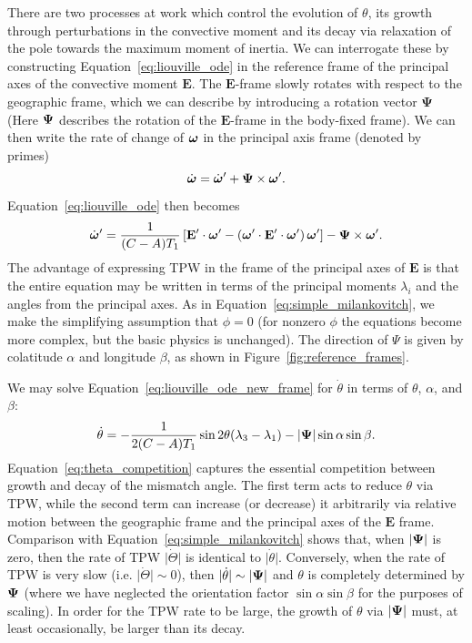 \documentclass[extra,mreferee]{gji}
\begin{document}
There are two processes at work which control the evolution of $\theta$, its growth through perturbations in the convective moment and 
its decay via relaxation of the pole towards the maximum moment of inertia.
We can interrogate these by constructing Equation~\eqref{eq:liouville_ode} in the reference frame
of the principal axes of the convective moment $\mathbf{E}$.
The $\mathbf{E}$-frame slowly rotates with respect to the geographic frame, which we can
describe by introducing a rotation vector $\mathbf{\Psi}$ 
(Here $\mitbf{\Psi}$ describes the rotation of the $\mathbf{E}$-frame in the body-fixed frame).
We can then write the rate of change of $\mitbf{\omega}$ in the principal axis frame (denoted by primes)
\begin{equation}
\dot{\mitbf{\omega}} = \dot{\mitbf{\omega}}^\prime + \mathbf{\Psi}\times \mitbf{\omega}^\prime.
\end{equation}
Equation~\eqref{eq:liouville_ode} then becomes
\begin{equation}
 \dot{\mitbf{\omega}}^\prime  = \frac{1}{(C-A)T_1} \left[ \mathbf{E}^\prime \cdot \mitbf{\omega}^\prime - \left( \mitbf{\omega}^\prime \cdot \mathbf{E}^\prime \cdot \mitbf{\omega}^\prime  \right) \mitbf{\omega}^\prime \right] - \mathbf{\Psi}\times \mitbf{\omega}^\prime.
\label{eq:liouville_ode_new_frame}
\end{equation}
The advantage of expressing TPW in the frame of the principal axes of $\mathbf{E}$ is that the entire equation
may be written in terms of the principal moments $\lambda_i$ and the angles from the principal axes.
As in Equation~\eqref{eq:simple_milankovitch}, we make the simplifying assumption that $\phi=0$
(for nonzero $\phi$ the equations become more complex, but the basic physics is unchanged).
The direction of $\Psi$ is given by colatitude $\alpha$ and longitude $\beta$, as shown in Figure~\ref{fig:reference_frames}.

We may solve Equation~\eqref{eq:liouville_ode_new_frame} for $\dot{\theta}$ in terms of $\theta$, $\alpha$, and $\beta$:
\begin{equation}
\dot{\theta} = 
-\frac{1}{2(C-A) T_1}\sin{2\theta} ( \lambda_3 - \lambda_1) - \vert \mitbf{\Psi} \vert \sin\alpha \sin\beta.
\label{eq:theta_competition}
\end{equation}
Equation~\eqref{eq:theta_competition} captures the essential competition between growth and decay of the mismatch angle.
The first term acts to reduce $\theta$ via TPW, while the second term can increase (or decrease) it arbitrarily via
relative motion between the geographic frame and the principal axes of the $\mathbf{E}$ frame.
Comparison with Equation~\eqref{eq:simple_milankovitch} shows that, when $\vert \mitbf{\Psi} \vert$ is zero,
then the rate of TPW $\vert \dot{\Theta} \vert$ is identical to $\vert \dot{\theta} \vert$.
Conversely, when the rate of TPW is very slow (i.e. $\vert \dot{\Theta} \vert \sim 0$), 
then $\vert \dot{\theta} \vert \sim \vert \mitbf{\Psi} \vert$ 
and $\theta$ is completely determined by $\mitbf{\Psi}$
(where we have neglected the orientation factor $\sin \alpha \sin \beta$ for the purposes of scaling).
In order for the TPW rate to be large, the growth of $\theta$ via $\vert \mitbf{\Psi} \vert$ must, 
at least occasionally, be larger than its decay.
\end{document}
